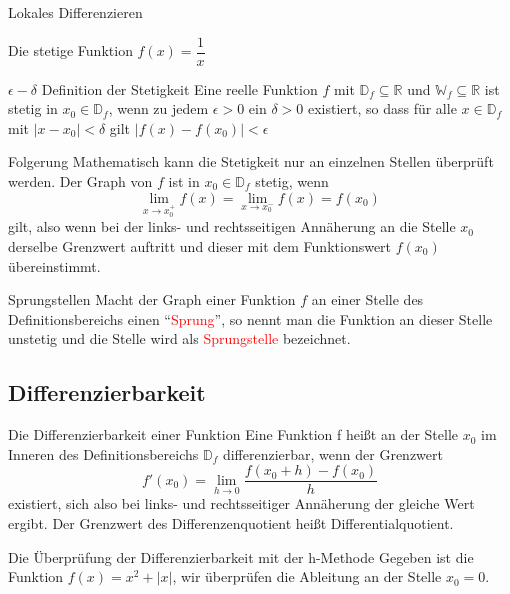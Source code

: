 \begin{section}{Lokales Differenzieren}
\begin{bsp}{Die stetige Funktion \(f(x) = \dfrac{1}{x}\)}{}
\begin{center}
\end{center}
\end{bsp}
\begin{defi}{\(\epsilon - \delta\) Definition der Stetigkeit}{}
    Eine reelle Funktion \(f\) mit \(\mathds{D}_f \subseteq \mathds{R}\) und \(\mathds{W}_f \subseteq \mathds{R} \) ist stetig in \(x_0 \in \mathds{D}_f\), wenn zu jedem \(\epsilon > 0\) ein \(\delta > 0\) existiert, so dass für alle \(x\in \mathds{D}_f\) mit \(\left|x-x_0 \right|<\delta\) gilt \(\left|f(x)-f(x_0)\right|<\epsilon\)
\end{defi}
\begin{merke}{Folgerung}{}
    Mathematisch kann die Stetigkeit nur an einzelnen Stellen überprüft werden. Der Graph von \(f\) ist in \(x_0 \in \mathds{D}_f\) stetig, wenn \[\lim\limits_{x\rightarrow x_0^+} f(x) =\lim\limits_{x\rightarrow x_0^-} f(x) = f(x_0)\] gilt, also wenn bei der links- und rechtsseitigen Annäherung an die Stelle \(x_0\) derselbe Grenzwert auftritt und dieser mit dem Funktionswert \(f(x_0)\) übereinstimmt.
\end{merke}
\begin{merke}{Sprungstellen}{}
    Macht der Graph einer Funktion \(f\) an einer Stelle des Definitionsbereichs einen \enquote{\textcolor{red}{Sprung}}, so nennt man die Funktion an dieser Stelle unstetig und die Stelle wird als \textcolor{red}{Sprungstelle} bezeichnet.
\end{merke}
\subsection{Differenzierbarkeit} 
\begin{defi}{Die Differenzierbarkeit einer Funktion}{}
 Eine Funktion f heißt an der Stelle $x_0$ im Inneren des Definitionsbereichs $\mathds{D}_f$ differenzierbar, wenn der Grenzwert \begin{equation*}
     f'(x_0) =\lim_{h\rightarrow 0}\dfrac{f(x_0 +h) -f(x_0)}{h}
 \end{equation*} existiert, sich also bei links- und rechtsseitiger Annäherung der gleiche Wert ergibt. Der Grenzwert des Differenzenquotient heißt Differentialquotient.
\end{defi}
\begin{bsp*}{Die Überprüfung der Differenzierbarkeit mit der h-Methode}
    Gegeben ist die Funktion $f(x)= x^2 + |x|$, wir überprüfen die Ableitung an der Stelle $x_0=0$.


\end{bsp*}
\end{section}
